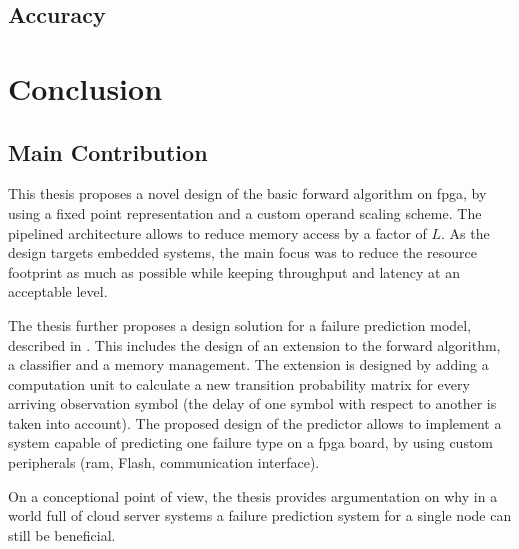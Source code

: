 \documentclass[mscthesis]{usiinfthesis}
\begin{document}
\section{Accuracy}

\chapter{Conclusion}
\label{ch:conc}
\glsresetall %

\section{Main Contribution}
\label{ch:conc_ach}

This thesis proposes a novel design of the basic forward algorithm on
\gls{fpga}, by using a fixed point representation and a custom operand scaling
scheme. The pipelined architecture allows to reduce memory access by a factor
of $L$. As the design targets embedded systems, the main focus was to reduce
the resource footprint as much as possible while keeping throughput and latency
at an acceptable level.

The thesis further proposes a design solution for a failure prediction model,
described in \cite{salfner08}. This includes the design of an extension to the
forward algorithm, a classifier and a memory management. The extension is
designed by adding a computation unit to calculate a new transition
probability matrix for every arriving observation symbol (the delay of one
symbol with respect to another is taken into account). The proposed design
of the predictor allows to implement a system capable of predicting one failure
type on a \gls{fpga} board, by using custom peripherals (\gls{ram}, Flash,
communication interface).

On a conceptional point of view, the thesis provides argumentation on why
in a world full of cloud server systems a failure prediction system for a single
node can still be beneficial.

\end{document}
